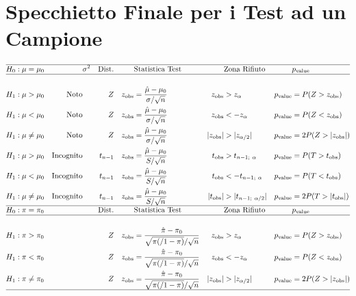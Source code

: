 \documentclass[
  11pt,
]{book}
\theoremstyle{mytheoremstyle}
\theoremstyle{mydefstyle}
\begin{document}
\clearpage

\section{Specchietto Finale per i Test ad un Campione}\label{specchietto-finale-per-i-test-ad-un-campione}

\begin{info2}

\small

\begin{align*}
\hline 
H_0:\mu&=\mu_0 &&\text{$\sigma^2$} &\text{Dist.}   & && \text{Statistica Test} &&   \text{Zona Rifiuto} &&p_\text{value}\\
\hline\\
H_1:\mu&>\mu_0 & \text{Noto} &&  Z && z_\text{obs}&=\frac{\hat \mu-\mu_0}{\sigma/\sqrt{n}} & z_\text{obs}&>z_\alpha & p_\text{value}&= P(Z>z_\text{obs})\\
H_1:\mu&<\mu_0 & \text{Noto} &&  Z && z_\text{obs}&=\frac{\hat \mu-\mu_0}{\sigma/\sqrt{n}} & z_\text{obs}&<-z_\alpha& p_\text{value}&= P(Z<z_\text{obs})\\
H_1:\mu&\ne\mu_0 & \text{Noto} &&  Z && z_\text{obs}&=\frac{\hat \mu-\mu_0}{\sigma/\sqrt{n}} & |z_\text{obs}|&>|z_{\alpha/2}| & p_\text{value}&= 2P(Z>|z_\text{obs}|)\\
H_1:\mu&>\mu_0 & \text{Incognito} &&  t_{n-1} && z_\text{obs}&=\frac{\hat \mu-\mu_0}{S/\sqrt{n}} & t_\text{obs}&>t_{n-1;~\alpha}& p_\text{value}&= P(T>t_\text{obs})\\
H_1:\mu&<\mu_0 & \text{Incognito} &&  t_{n-1} && z_\text{obs}&=\frac{\hat \mu-\mu_0}{S/\sqrt{n}} & t_\text{obs}&<-t_{n-1;~\alpha}& p_\text{value}&= P(T<t_\text{obs})\\
H_1:\mu&\ne\mu_0 & \text{Incognito} &&  t_{n-1} && z_\text{obs}&=\frac{\hat \mu-\mu_0}{S/\sqrt{n}} & |t_\text{obs}|&>|t_{n-1;~\alpha/2}|& p_\text{value}&= 2P(T>|t_\text{obs}|)\\
\hline
H_0:\pi&=\pi_0 && &\text{Dist.}   && &\text{Statistica Test} &&   \text{Zona Rifiuto} &&p_\text{value}\\
\hline\\
H_1:\pi&>\pi_0 &  &&  Z && z_\text{obs}&=\frac{\hat \pi-\pi_0}{\sqrt{\pi(/1-\pi)}/\sqrt{n}} & z_\text{obs}&>z_\alpha& p_\text{value}&= P(Z>z_\text{obs})\\
H_1:\pi&<\pi_0 &  &&  Z && z_\text{obs}&=\frac{\hat \pi-\pi_0}{\sqrt{\pi(/1-\pi)}/\sqrt{n}} & z_\text{obs}&<-z_\alpha& p_\text{value}&= P(Z<z_\text{obs})\\
H_1:\pi&\ne\pi_0 &  &&  Z && z_\text{obs}&=\frac{\hat \pi-\pi_0}{\sqrt{\pi(/1-\pi)}/\sqrt{n}} & |z_\text{obs}|&>|z_{\alpha/2}| & p_\text{value}&= 2P(Z>|z_\text{obs}|)\\
\hline
\end{align*}

\end{info2}
\end{document}
